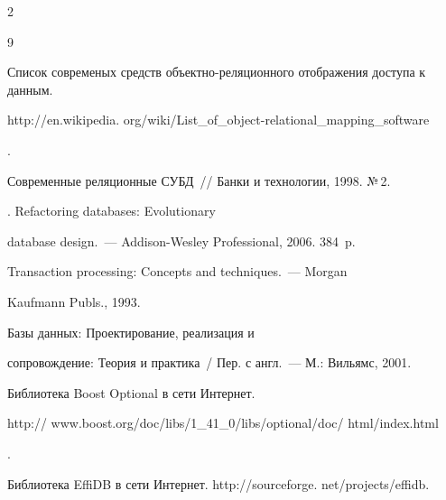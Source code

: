 \begin{multicols}{2}
{{\begin{thebibliography}{9}




Список современых средств объектно-ре\-ля\-ци\-он\-но\-го отображения доступа к данным.  {\sf 

http://en.wikipedia. org/wiki/List\_of\_object-relational\_mapping\_software}.




 Современные реляционные СУБД~// Банки и технологии, 1998. №\,2.




. Refactoring databases: Evolutionary 

database design.~--- Addison-Wesley Professional, 2006. 384~p.




 Transaction processing: Concepts and techniques.~--- Morgan 

Kaufmann Publs., 1993.




 Базы данных: Проектирование, реализация и 

сопровождение: Теория и практика~/ Пер. с англ.~--- М.: Вильямс, 2001.




Библиотека Boost Optional в сети Интернет. {\sf 

http:// www.boost.org/doc/libs/1\_41\_0/libs/optional/doc/ html/index.html}.



\label{end\stat}




Библиотека EffiDB в сети Интернет. {\sf http://sourceforge. net/projects/effidb}.

 \end{thebibliography}

}

}





\end{multicols}       

